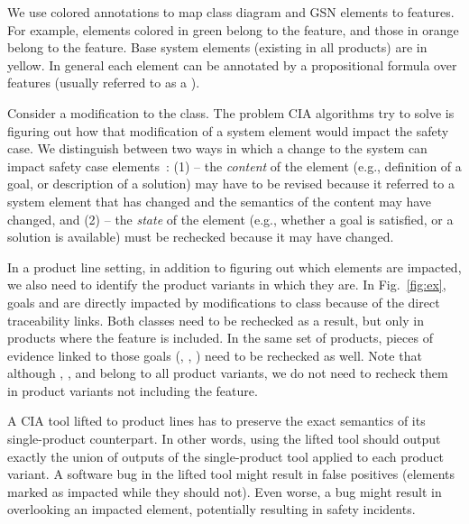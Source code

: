We use colored annotations to map class diagram and GSN elements to features. For example, elements colored in green belong to the  feature, and those in orange belong to the  feature. Base system elements (existing in all products) are in yellow. 
In general each element can be annotated by a propositional formula over features (usually referred to as a ).

Consider a modification to the   class. The problem CIA algorithms try to solve is figuring out how that modification of a system element would impact the safety case. 
We distinguish between two ways in which a change to the system can impact safety case elements~\cite{Kokaly:2017}: 
(1)  -- the \emph{content} of the element (e.g., definition of a goal, or description of a solution) may have to be revised because it referred to a system element that has changed and the semantics of the content may have changed, and 
(2)  -- the \emph{state} of the element (e.g., whether a goal is satisfied, or a solution is available) must be rechecked because it may have changed.

In a product line setting, in addition to figuring out which elements are impacted, we also need to identify the product variants in which they are. In Fig.~\ref{fig:ex}, goals  and  are directly impacted by modifications to class  because of the direct traceability links. %
Both classes need to be rechecked as a result, but only in products where the  feature is included.
In the same set of products, pieces of evidence linked to those goals (, , ) need to be rechecked as well.
Note that although , , and  belong to all product variants, we do not need to recheck them in product variants not including the  feature.

A CIA tool lifted to product lines has to preserve the exact semantics of its single-product counterpart. In other words, using the lifted tool should output exactly the union of outputs of the single-product tool applied to each product variant. A software bug in the lifted tool might result in false positives (elements marked as impacted while they should not). Even worse, a bug might result in overlooking an impacted element, potentially resulting in safety incidents.


